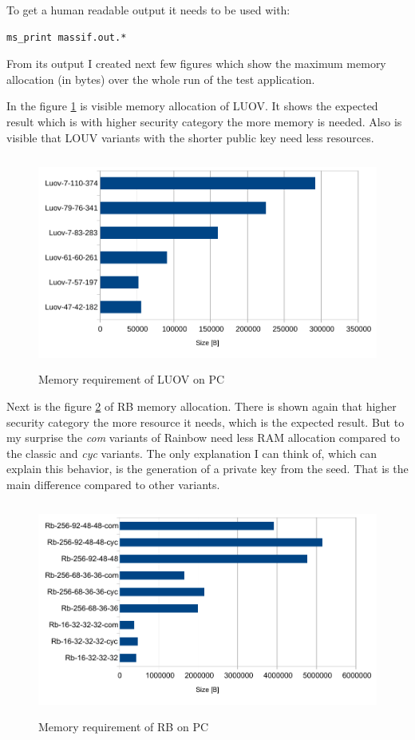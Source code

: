 \documentclass[thesis=M,english]{FITthesis}[2019/12/23]
\begin{document}
\noindent
To get a human readable output it needs to be used with:
\begin{lstlisting}[frame=single]
ms_print massif.out.*
\end{lstlisting}
\noindent
From its output I created next few figures which show the maximum memory allocation (in bytes) over the whole run of the test application. 

\bigskip
\noindent
In the figure \ref{mem-pc-luov} is visible memory allocation of LUOV. It shows the expected result which is with higher security category the more memory is needed. Also is visible that LOUV variants with the shorter public key need less resources.

\begin{figure}[H]
\centering
\includegraphics[width=13cm,height=7cm]{images/mem-pc-luov.pdf}
\caption{Memory requirement of LUOV on PC}
\label{mem-pc-luov}
\end{figure}

\noindent
Next is the figure \ref{mem-pc-rb} of RB memory allocation. There is shown again that higher security category the more resource it needs, which is the expected result. But to my surprise the \textit{com} variants of Rainbow need less RAM allocation compared to the classic and \textit{cyc} variants. The only explanation I can think of, which can explain this behavior, is the generation of a private key from the seed. That is the main difference compared to other variants.
\begin{figure}[H]
\centering
\includegraphics[width=13cm,height=7cm]{images/mem-pc-rb.pdf}
\caption{Memory requirement of RB on PC}
\label{mem-pc-rb}
\end{figure}
\end{document}
